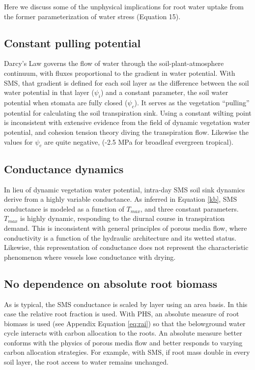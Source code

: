 \documentclass[draft,linenumbers]{agujournal}
\begin{document}
    Here we discuss some of the unphysical implications for root water uptake from the former parameterization of water stress (Equation 15).
    
    \subsection{Constant pulling potential}
    Darcy's Law governs the flow of water through the soil-plant-atmosphere continuum, 
    with fluxes proportional to the gradient in water potential. 
    With SMS, that gradient is defined for each soil layer as 
    the difference between the soil water potential in that layer ($\psi_i$) 
    and a constant parameter, the soil water potential when stomata are fully closed ($\psi_{c}$).
    It serves as the vegetation ``pulling'' potential for calculating the soil transpiration sink.
    Using a constant wilting point is inconsistent with extensive evidence from the field of dynamic vegetation water potential, and cohesion tension theory diving the transpiration flow.
    Likewise the values for $\psi_{c}$ are quite negative, (-2.5 MPa for broadleaf evergreen tropical). 
    
    \subsection{Conductance dynamics}
    In lieu of dynamic vegetation water potential, intra-day SMS soil sink dynamics derive from a highly variable conductance.
    As inferred in Equation \ref{kb}, SMS conductance is modeled as a function of $T_{max}$, and three constant parameters.
    $T_{max}$ is highly dynamic, responding to the diurnal course in transpiration demand.
    This is inconsistent with general principles of porous media flow, where conductivity is a function of the hydraulic architecture and its wetted status.
    Likewise, this representation of conductance does not represent the characteristic phenomenon where vessels lose conductance with drying.
      
    \subsection{No dependence on absolute root biomass}
    As is typical, the SMS conductance is scaled by layer using an area basis.
    In this case the relative root fraction is used.
    With PHS, an absolute measure of root biomass is used (see Appendix Equation \ref{eq:rai}) so that the belowground water cycle interacts with carbon allocation to the roots.
    An absolute measure better conforms with the physics of porous media flow and better responds to varying carbon allocation strategies.
    For example, with SMS, if root mass double in every soil layer, the root access to water remains unchanged.
\end{document}
